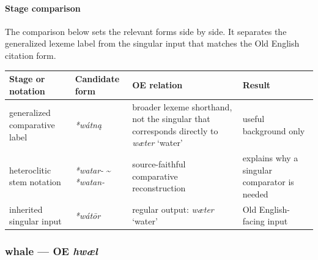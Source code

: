 \documentclass[
  british,
  a4paper,
]{article}
\newcounter{none} %
\begin{document}
\paragraph{Stage comparison}\label{stage-comparison-3}

The comparison below sets the relevant forms side by side. It separates
the generalized lexeme label from the singular input that matches the
Old English citation form.

{\def\LTcaptype{none} %
\begin{longtable}[]{@{}
  >{\raggedright\arraybackslash}p{}
  >{\raggedright\arraybackslash}p{}
  >{\raggedright\arraybackslash}p{}
  >{\raggedright\arraybackslash}p{}@{}}
\toprule\noalign{}
\begin{minipage}[b]{\linewidth}\raggedright
Stage or notation
\end{minipage} & \begin{minipage}[b]{\linewidth}\raggedright
Candidate form
\end{minipage} & \begin{minipage}[b]{\linewidth}\raggedright
OE relation
\end{minipage} & \begin{minipage}[b]{\linewidth}\raggedright
Result
\end{minipage} \\
\midrule\noalign{}
\endhead
\bottomrule\noalign{}
\endlastfoot
generalized comparative label & {\emph{*wátną}} & broader lexeme
shorthand, not the singular that corresponds directly to {\emph{wæter}}
`water' & useful background only \\
heteroclitic stem notation & \emph{*watar-} \textasciitilde{}
\emph{*watan-} & source-faithful comparative reconstruction & explains
why a singular comparator is needed \\
inherited singular input & {\emph{*wátōr}} & regular output:
{\emph{wæter}} `water' & Old English-facing input \\
\end{longtable}
}

\subsubsection{\texorpdfstring{whale --- OE
\emph{hwæl}}{whale --- OE hwæl}}\label{whale-oe-hwuxe6l}
\end{document}

